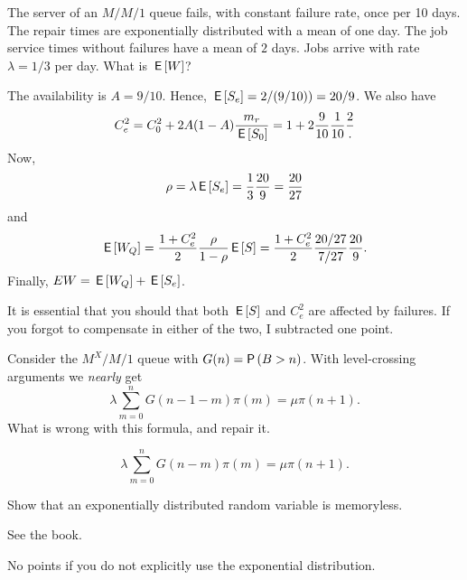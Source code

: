 \begin{exercise}[201704]
 The server of an $M/M/1$ queue fails, with constant failure rate, once per 10 days.
 The repair times are exponentially distributed with a mean of one day.
 The job service times without failures have a mean of $2$ days.
 Jobs arrive with rate $\lambda=1/3$ per day.
 What is $\,\mathsf{E}\left[W\right]$?
\begin{solution}
 The availability is $A=9/10$. Hence, $\,\mathsf{E}\left[S_e\right] = 2/(9/10)) = 20/9$. We also have
\begin{equation*}
 C_e^2 = C_0^2 + 2A(1-A)\frac{m_r}{\,\mathsf{E}\left[S_0\right]} = 1 + 2\frac{9}{10}\frac1{10}\frac{2}.
 \end{equation*}
Now,
\begin{equation*}
 \rho = \lambda \,\mathsf{E}\left[S_e\right] = \frac13 \frac{20}9 = \frac{20}{27}
\end{equation*}
and
\begin{equation*}
 \,\mathsf{E}\left[W_Q\right] = \frac{1 + C_e^2}2 \frac{\rho}{1-\rho} \,\mathsf{E}\left[S\right] = \frac{1 + C_e^2}2 \frac{20/27}{7/27} \frac{20}9.
\end{equation*}
Finally, $E W = \,\mathsf{E}\left[W_Q\right] + \,\mathsf{E}\left[S_e\right]$.

It is essential that you should that both $\,\mathsf{E}\left[S\right]$ and $C_e^2$ are affected by failures. If you forgot to compensate in either of the two, I subtracted one point. 
\end{solution}
\end{exercise}

\begin{exercise}[201704]%
 Consider the $M^X/M/1$ queue with $G(n) = \P{B>n}$.
 With level-crossing arguments we \emph{nearly} get
\begin{equation*}
\lambda \sum_{m=0}^n G(n-1-m) \pi(m) = \mu \pi(n+1).
\end{equation*}
What is wrong with this formula, and repair it.
\begin{solution}
\begin{equation*}
\lambda \sum_{m=0}^n G(n-m) \pi(m) = \mu \pi(n+1).
\end{equation*}
\end{solution}
\end{exercise}


\begin{exercise}[201706]
 Show that an exponentially distributed random variable is memoryless.
\begin{solution}
 See the book.

No points if you do not explicitly use the exponential distribution.
\end{solution}
\end{exercise}


